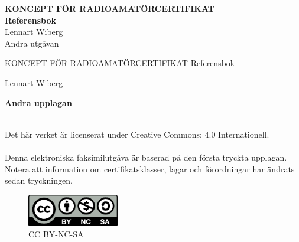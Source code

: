 \documentclass[a4paper,twoside,openright]{book}
\begin{document}
\AddToShipoutPicture*{\BackgroundPic}

\pagestyle{empty}



\onecolumn
\vspace{3cm}
\begin{center}
\Huge{\bfseries{\color{white}KONCEPT FÖR RADIO\-AMATÖRCERTIFIKAT}} \\[2ex]
\Huge{\bfseries{\color{white}Referensbok}} \\[2ex]
\huge{\color{white}Lennart Wiberg} \\
\Large{\color{white}Andra utgåvan}
\end{center}

\clearpage





\vspace{10em}

\begin{center}
\Large{KONCEPT FÖR RADIOAMATÖRCERTIFIKAT}
\Large{Referensbok}

Lennart Wiberg\\[2\baselineskip]
\end{center}


\noindent \textbf{Andra upplagan}
\begin{rev-granskat}[UEI]
\noindent
\\ 
\noindent Det här verket är licenserat under Creative Commons:\newline
\noindent{} 4.0 Internationell.
\\
\\
\noindent Denna elektroniska faksimilutgåva är baserad på den första tryckta
upplagan. Notera att information om certifikatsklasser, lagar och förordningar
har ändrats sedan tryckningen.
\end{rev-granskat}

\begin{figure}
    \includegraphics[width=4cm]{images/cc-by-nc-sa}
    \caption*{CC BY-NC-SA}
\end{figure}
\end{document}
